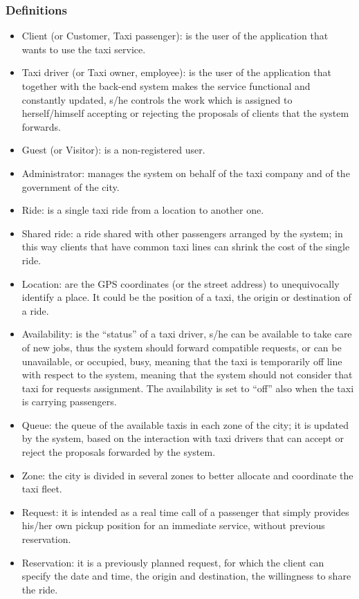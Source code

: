 \documentclass[a4paper,11pt]{report} %
\begin{document}
	\subsubsection{Definitions}
		\begin{itemize}
			\item Client (or Customer, Taxi passenger): is the user of the application that wants to use the taxi service.
			\item Taxi driver (or Taxi owner, employee): is the user of the application that together with the back-end system makes the service functional and constantly updated, s/he controls the work which is assigned to herself/himself accepting or rejecting the proposals of clients that the system forwards. 
			\item Guest (or Visitor): is a non-registered user.
			\item Administrator: manages the system on behalf of the taxi company and of the government of the city.
			\item Ride: is a single taxi ride from a location to another one.
			\item Shared ride: a ride shared with other passengers arranged by the system; in this way clients that have common taxi lines can shrink the cost of the single ride.
			\item Location: are the GPS coordinates (or the street address) to unequivocally identify a place. It could be the position of a taxi, the origin or destination of a ride.
			\item Availability: is the ``status'' of a taxi driver, s/he can be available to take care of new jobs, thus the system should forward compatible requests, or can be unavailable, or occupied, busy, meaning that the taxi is temporarily off line with respect to the system, meaning that the system should not consider that taxi for requests assignment. The availability is set to ``off'' also when the taxi is carrying passengers.
			\item Queue: the queue of the available taxis in each zone of the city; it is updated by the system, based on the interaction with taxi drivers that can accept or reject the proposals forwarded by the system. 
			\item Zone: the city is divided in several zones to better allocate and coordinate the taxi fleet.
			\item Request: it is intended as a real time call of a passenger that simply provides his/her own pickup position for an immediate service, without previous reservation.
			\item Reservation: it is a previously planned request, for which the client can specify the date and time, the origin and destination, the willingness to share the ride.
		\end{itemize}
		
\end{document}
